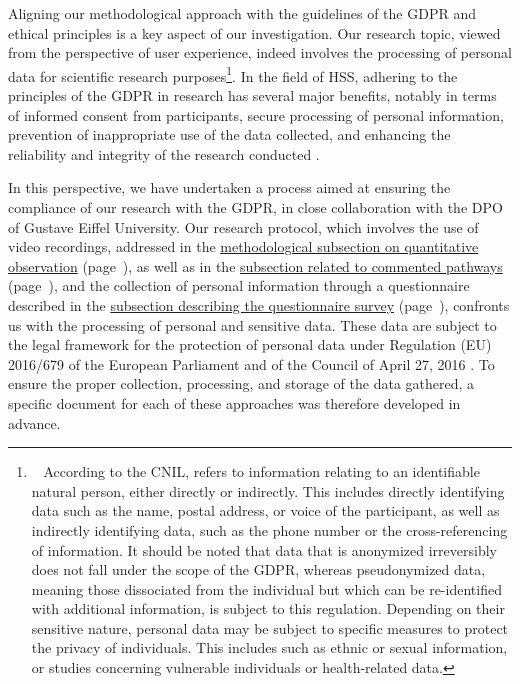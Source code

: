 \begin{refsegment}
Aligning our methodological approach with the guidelines of the \acrfull{GDPR} and ethical principles is a key aspect of our investigation. Our research topic, viewed from the perspective of user experience, indeed involves the processing of personal data for scientific research purposes\footnote{~
According to the \acrfull{CNIL},  refers to information relating to an identifiable natural person, either directly or indirectly. This includes directly identifying data such as the name, postal address, or voice of the participant, as well as indirectly identifying data, such as the phone number or the cross-referencing of information. It should be noted that data that is anonymized irreversibly does not fall under the scope of the \acrshort{GDPR}, whereas pseudonymized data, meaning those dissociated from the individual but which can be re-identified with additional information, is subject to this regulation. Depending on their sensitive nature, personal data may be subject to specific measures to protect the privacy of individuals. This includes  such as ethnic or sexual information, or studies concerning vulnerable individuals or health-related data.
}. In the field of \acrfull{HSS}, adhering to the principles of the \acrshort{GDPR} in research has several major benefits, notably in terms of informed consent from participants, secure processing of personal information, prevention of inappropriate use of the data collected, and enhancing the reliability and integrity of the research conducted \textcolor{blue}{\autocite[465]{cotton_using_2010}}.%

In this perspective, we have undertaken a process aimed at ensuring the compliance of our research with the \acrshort{GDPR}, in close collaboration with the \acrfull{DPO} of Gustave Eiffel University. Our research protocol, which involves the use of video recordings, addressed in the \hyperref[chap3:observation-quantitative]{methodological subsection on quantitative observation} (page~\pageref{chap3:observation-quantitative}), as well as in the \hyperref[chap3:parcours-commente]{subsection related to commented pathways} (page~\pageref{chap3:parcours-commente}), and the collection of personal information through a questionnaire described in the \hyperref[chap3:questionnaire]{subsection describing the questionnaire survey} (page~\pageref{chap3:questionnaire}), confronts us with the processing of personal and sensitive data. These data are subject to the legal framework for the protection of personal data under Regulation (EU) 2016/679 of the European Parliament and of the Council of April 27, 2016 \textcolor{blue}{\autocite[]{cnil_reglement_2018}}. To ensure the proper collection, processing, and storage of the data gathered, a specific document for each of these approaches was therefore developed in advance.%


\end{refsegment}
